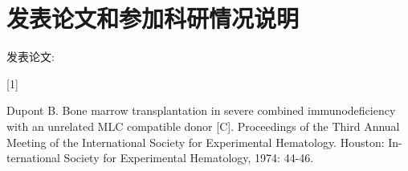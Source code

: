 
\chapter*{发表论文和参加科研情况说明}



\noindent
发表论文: 

\noindent
[1] \parbox[t]{26em}{
    Dupont B. Bone marrow transplantation in severe combined immunodeficiency with an unrelated MLC compatible donor [C]. Proceedings of the Third Annual Meeting of the International Society for Experimental Hematology. Houston: In-ternational Society for Experimental Hematology, 1974: 44-46.
    }



\newpage